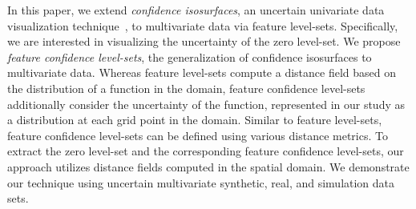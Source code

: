 In this paper, we extend \textit{confidence isosurfaces}, an uncertain univariate data visualization technique~\cite{zehner2010visualization}, to multivariate data via feature level-sets.
%
Specifically, we are interested in visualizing the uncertainty of the zero level-set.
%
We propose \textit{feature confidence level-sets}, the generalization of confidence isosurfaces to multivariate data.
%
%
Whereas feature level-sets compute a distance field based on the distribution of a function in the domain, feature confidence level-sets additionally consider the uncertainty of the function, represented in our study as a distribution at each grid point in the domain.
%
Similar to feature level-sets, feature confidence level-sets can be defined using various distance metrics.
%
To extract the zero level-set and the corresponding feature confidence level-sets, our approach utilizes distance fields computed in the spatial domain.
%
%
%
We demonstrate our technique using uncertain multivariate synthetic, real, and simulation data sets.

